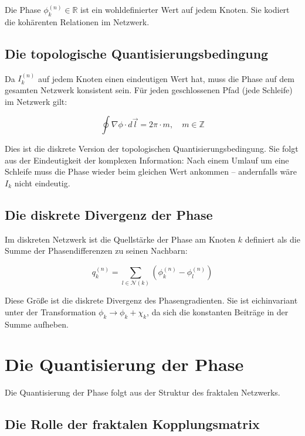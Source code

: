 Die Phase \( \phi_k^{(n)} \in \mathbb{R} \) ist ein wohldefinierter Wert auf jedem Knoten. Sie kodiert die kohärenten Relationen im Netzwerk.

\subsection{Die topologische Quantisierungsbedingung}
\label{sub:phasenquantisierung_topologie}

Da \( I_k^{(n)} \) auf jedem Knoten einen eindeutigen Wert hat, muss die Phase auf dem gesamten Netzwerk konsistent sein. Für jeden geschlossenen Pfad (jede Schleife) im Netzwerk gilt:

\[
\oint \nabla \phi \cdot d\vec{l} = 2\pi \cdot m, \quad m \in \mathbb{Z}
\tag{R.1}
\]

Dies ist die diskrete Version der topologischen Quantisierungsbedingung. Sie folgt aus der Eindeutigkeit der komplexen Information: Nach einem Umlauf um eine Schleife muss die Phase wieder beim gleichen Wert ankommen – andernfalls wäre \( I_k \) nicht eindeutig.

\subsection{Die diskrete Divergenz der Phase}
\label{sub:phasenquantisierung_divergenz}

Im diskreten Netzwerk ist die Quellstärke der Phase am Knoten \( k \) definiert als die Summe der Phasendifferenzen zu seinen Nachbarn:

\[
q_k^{(n)} = \sum_{l \in \mathcal{N}(k)} \left( \phi_k^{(n)} - \phi_l^{(n)} \right)
\tag{R.2}
\]

Diese Größe ist die diskrete Divergenz des Phasengradienten. Sie ist eichinvariant unter der Transformation \( \phi_k \to \phi_k + \chi_k \), da sich die konstanten Beiträge in der Summe aufheben.

\section{Die Quantisierung der Phase}
\label{app:phasenquantisierung_quantisierung}

Die Quantisierung der Phase folgt aus der Struktur des fraktalen Netzwerks.

\subsection{Die Rolle der fraktalen Kopplungsmatrix}
\label{sub:phasenquantisierung_kopplung}

